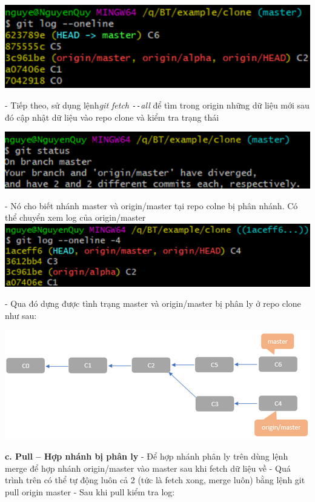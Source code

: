 \documentclass[12pt,a4paper]{report}
\begin{document}
 	\label{fig:screenshot071}
 \vskip 0.4cm\vskip 0.4cm
 	\includegraphics[width=0.8\linewidth]{screenshot072}
 
 	\label{fig:screenshot072}
\vskip 0.4cm\vskip 0.4cm
 - Tiếp theo, sử dụng lệnh{\it git fetch \texttt{-{}-}all} để  tìm trong origin những dữ liệu mới sau đó cập nhật dữ liệu vào repo clone và kiểm tra trạng thái\vskip 0.4cm

 	\includegraphics[width=0.8\linewidth]{screenshot073}
 
 	\label{fig:screenshot073}\vskip 0.4cm\vskip 0.4cm

 - Nó cho biết nhánh master và origin/master tại repo colne bị phân nhánh. Có thể chuyển xem log của origin/master
\vskip 0.4cm
 	\includegraphics[width=0.8\linewidth]{screenshot074}
 
 	\label{fig:screenshot074}
 \vskip 0.4cm\vskip 0.4cm
 - Qua đó dựng được tình trạng master và origin/master bị phân ly ở repo clone như sau:\vskip 0.4cm

 	\includegraphics[width=0.8\linewidth]{screenshot075}
 
 	\label{fig:screenshot075}
 \vskip 0.4cm\vskip 0.4cm
{\bf c. Pull – Hợp nhánh bị phân ly}\vskip 0.4cm
 - Để hợp nhánh phân ly trên dùng lệnh merge để hợp nhánh origin/master vào master sau khi fetch dữ liệu về\vskip 0.4cm
 - Quá trình trên có thể tự động luôn cả 2 (tức là fetch xong, merge luôn) bằng lệnh git pull origin master\vskip 0.4cm
 -  Sau khi pull kiểm tra log:\vskip 0.4cm
 
\end{document}
